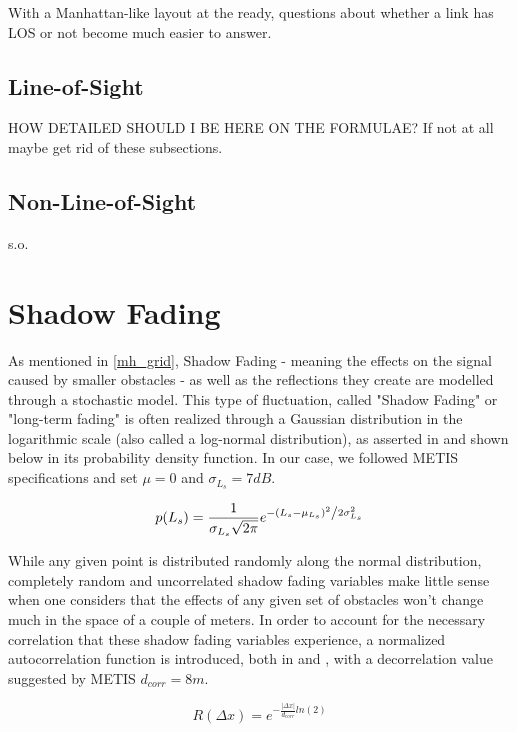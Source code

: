 With a Manhattan-like layout at the ready, questions about whether a link has LOS or not become much easier to answer.

\subsection{Line-of-Sight}
HOW DETAILED SHOULD I BE HERE ON THE FORMULAE?
If not at all maybe get rid of these subsections.

\subsection{Non-Line-of-Sight}
s.o.

\section{Shadow Fading} \label{SF}
As mentioned in \ref{mh_grid}, Shadow Fading - meaning the effects on the signal caused by smaller obstacles - as well as the reflections they create are modelled through a stochastic model. This type of fluctuation, called "Shadow Fading" or "long-term fading" is often realized through a Gaussian distribution in the logarithmic scale (also called a log-normal distribution), as asserted in \cite{Forkel2004} and shown below in its probability density function. In our case, we followed METIS specifications and set $\mu = 0$ and $\sigma_{L_s} = 7 dB$.

\begin{equation} \label{eq:SF}
p(L_s) = \frac{1}{{\sigma_{L_s} \sqrt {2\pi } }}e^{{{ - \left( {L_s - \mu_{L_s} } \right)^2 } \mathord{\left/ {\vphantom {{ - \left( {x - \mu } \right)^2 } {2\sigma_{L_s} ^2 }}} \right. \kern-\nulldelimiterspace} {2\sigma_{L_s} ^2 }}}
\end{equation}

While any given point is distributed randomly along the normal distribution, completely random and uncorrelated shadow fading variables make little sense when one considers that the effects of any given set of obstacles won't change much in the space of a couple of meters. In order to account for the necessary correlation that these shadow fading variables experience, a normalized autocorrelation function is introduced, both in \cite{Forkel2004} and \cite{Raschkowski}, with a decorrelation value suggested by METIS $d_{corr} = 8 m$.

\begin{equation} \label{eq:corr}
R(\Delta x) = e^{-\frac{|\Delta x|}{d_{corr}} ln(2)}
\end{equation}

